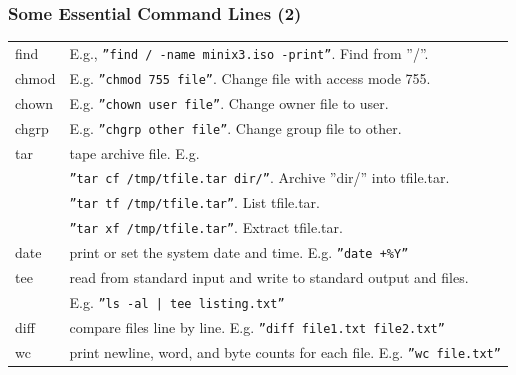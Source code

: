 \documentclass[aspectratio=169, xcolor=table, notheorems, hyperref={pdfpagelabels=false}]{beamer}
\begin{document}
\begin{frame}
\frametitle{Some Essential Command Lines (2)}
\begin{tabular}{l l}
\hline
find   & E.g., \texttt{''find / -name minix3.iso -print''}. Find from ''/''.      \\
chmod  & E.g. \texttt{''chmod 755 file''}. Change file with access mode 755.    \\
chown  & E.g. \texttt{''chown user file''}. Change owner file to user.          \\
chgrp  & E.g. \texttt{''chgrp other file''}. Change group file to other.        \\
tar    & tape archive file. E.g.                                                \\
       & \texttt{''tar cf /tmp/tfile.tar  dir/''}. Archive ''dir/'' into tfile.tar. \\
       & \texttt{''tar tf /tmp/tfile.tar''}. List tfile.tar.                   \\
       & \texttt{''tar xf /tmp/tfile.tar''}. Extract tfile.tar.                \\
date   & print or set the system date and time. E.g. \texttt{''date +\%Y''}     \\
tee    & read from standard input and write to standard output and files.      \\
       & E.g. \texttt{''ls -al | tee listing.txt''}                             \\
diff   & compare files line by line. E.g. \texttt{''diff file1.txt file2.txt''} \\
wc     & print newline, word, and byte counts for each file.  E.g. \texttt{''wc file.txt''}  \\
\hline
\end{tabular}
\end{frame}

\end{document}
